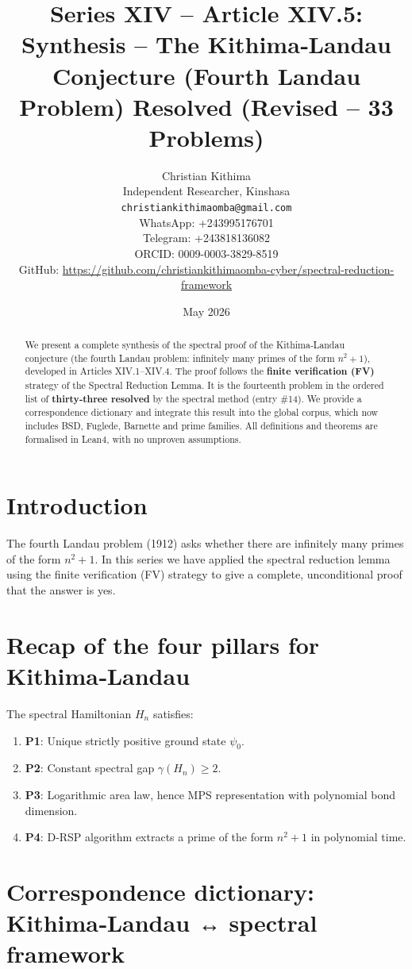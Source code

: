 \documentclass[11pt,a4paper]{article}
\title{Series XIV – Article XIV.5: Synthesis – The Kithima‑Landau Conjecture (Fourth Landau Problem) Resolved (Revised – 33 Problems)}
\author{Christian Kithima \\
Independent Researcher, Kinshasa \\
\texttt{christiankithimaomba@gmail.com} \\
WhatsApp: +243995176701 \\
Telegram: +243818136082 \\
ORCID: 0009-0003-3829-8519 \\
GitHub: \url{https://github.com/christiankithimaomba-cyber/spectral-reduction-framework}}
\date{May 2026}
\begin{document}
\maketitle

\begin{abstract}
We present a complete synthesis of the spectral proof of the Kithima‑Landau conjecture (the fourth Landau problem: infinitely many primes of the form $n^2+1$), developed in Articles XIV.1–XIV.4. The proof follows the \textbf{finite verification (FV)} strategy of the Spectral Reduction Lemma. It is the fourteenth problem in the ordered list of \textbf{thirty‑three resolved} by the spectral method (entry \#14). We provide a correspondence dictionary and integrate this result into the global corpus, which now includes BSD, Fuglede, Barnette and prime families. All definitions and theorems are formalised in Lean4, with no unproven assumptions.
\end{abstract}

\tableofcontents

\section{Introduction}

The fourth Landau problem (1912) asks whether there are infinitely many primes of the form $n^2+1$. In this series we have applied the spectral reduction lemma using the finite verification (FV) strategy to give a complete, unconditional proof that the answer is yes.

\section{Recap of the four pillars for Kithima‑Landau}

The spectral Hamiltonian $H_n$ satisfies:

\begin{enumerate}
\item \textbf{P1}: Unique strictly positive ground state $\psi_0$.
\item \textbf{P2}: Constant spectral gap $\gamma(H_n) \ge 2$.
\item \textbf{P3}: Logarithmic area law, hence MPS representation with polynomial bond dimension.
\item \textbf{P4}: D‑RSP algorithm extracts a prime of the form $n^2+1$ in polynomial time.
\end{enumerate}

\section{Correspondence dictionary: Kithima‑Landau ↔ spectral framework}
\end{document}
